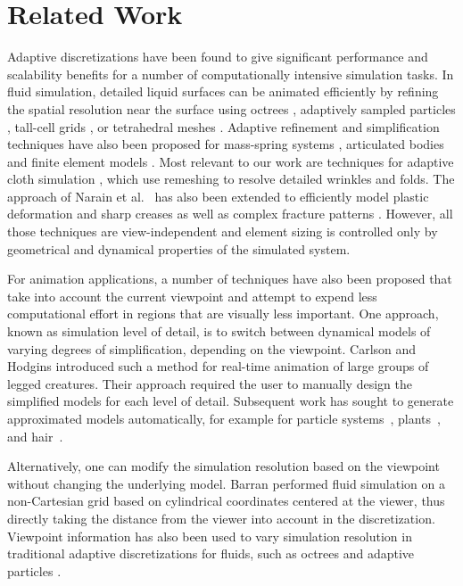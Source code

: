 \documentclass[10pt,journal,compsoc,twoside]{TexInputs/IEEEtran}
\begin{document}




\section{Related Work}

Adaptive discretizations have been found to give significant performance and
scalability benefits for a number of computationally intensive simulation
tasks. In fluid simulation, detailed liquid surfaces can be animated
efficiently by refining the spatial resolution near the surface using octrees
\cite{Losasso:2004:SWS}, adaptively sampled particles \cite{Adams:2007:ASP},
tall-cell grids \cite{Chentanez:2011:REW}, or tetrahedral meshes
\cite{Klingner:2006:FAD,Chentanez:2007:LSL,Ando:2013:HAL}. Adaptive refinement
and simplification techniques have also been proposed for mass-spring systems
\cite{Hutchinson:1996:ARM}, articulated bodies \cite{Redon:2005:ADA} and
finite element models \cite{Grinspun:2002:CSF}. Most relevant to our work
are techniques for adaptive cloth simulation
\cite{Thingvold:1990:PMB,Li:2005:CAA,Villard:2005:AMC,Brochu:2012:EGE,Narain:2012:AAR},
which use remeshing to resolve detailed wrinkles and folds. The approach of
Narain et al.~\cite{Narain:2012:AAR} has also been extended to efficiently model
plastic deformation and sharp creases \cite{Narain:2013:FCA} as well as complex
fracture patterns \cite{Pfaff:2014:ATC}. However, all those techniques 
are view-independent and element sizing is controlled only by geometrical and dynamical
properties of the simulated system.

For animation applications, a number of techniques have also been proposed that
take into account the current viewpoint and attempt to expend less
computational effort in regions that are visually less important. One approach,
known as simulation level of detail, is to switch between dynamical
models of varying degrees of simplification, depending on the viewpoint.
Carlson and Hodgins \cite{Carlson:1997:SLD} introduced such a method for
real-time animation of large groups of legged creatures. Their
approach required the user to manually design the simplified models for each
level of detail. %
Subsequent work has sought to generate approximated
models automatically, for example for particle systems~\cite{OBrien:2001:ASP},
plants~\cite{Beaudoin:2004:SLD}, and hair~\cite{Ward:2003:MHU}.

Alternatively, one can modify the simulation resolution based on the viewpoint without changing the underlying model.
Barran \cite{Barran:2006:VDF} performed fluid simulation on a non-Cartesian grid based on cylindrical coordinates centered at the viewer, thus directly taking the distance from the viewer into account in the
discretization.
Viewpoint information has also been used to vary simulation resolution in traditional adaptive discretizations for fluids, such as octrees \cite{Kim:2006:VAA,Bunlutangtum:2011:EVA} and adaptive particles \cite{Solenthaler:2011:TPS}.
\end{document}
